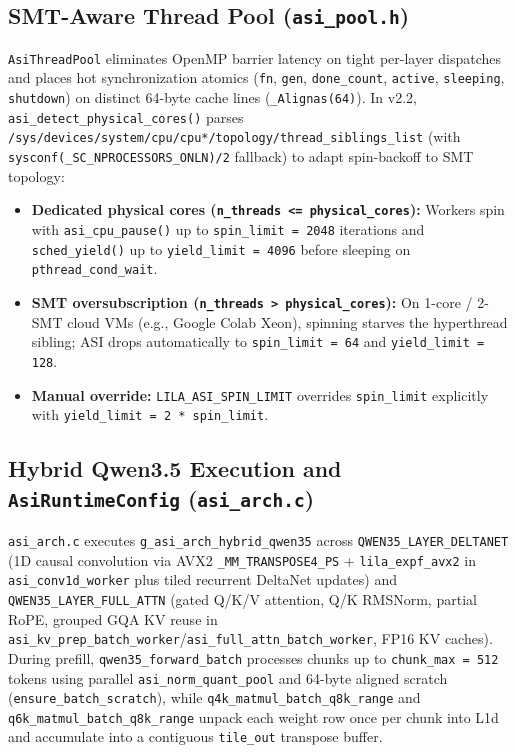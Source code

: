 \documentclass[11pt,a4paper]{article}
\begin{document}
\subsection{SMT-Aware Thread Pool (\texttt{asi\_pool.h})}
\texttt{AsiThreadPool} eliminates OpenMP barrier latency on tight per-layer dispatches and places hot synchronization atomics (\texttt{fn}, \texttt{gen}, \texttt{done\_count}, \texttt{active}, \texttt{sleeping}, \texttt{shutdown}) on distinct 64-byte cache lines (\texttt{\_Alignas(64)}). In v2.2, \texttt{asi\_detect\_physical\_cores()} parses \texttt{/sys/devices/system/cpu/cpu*/topology/thread\_siblings\_list} (with \texttt{sysconf(\_SC\_NPROCESSORS\_ONLN)/2} fallback) to adapt spin-backoff to SMT topology:
\begin{itemize}
    \item \textbf{Dedicated physical cores (\texttt{n\_threads <= physical\_cores}):} Workers spin with \texttt{asi\_cpu\_pause()} up to \texttt{spin\_limit = 2048} iterations and \texttt{sched\_yield()} up to \texttt{yield\_limit = 4096} before sleeping on \texttt{pthread\_cond\_wait}.
    \item \textbf{SMT oversubscription (\texttt{n\_threads > physical\_cores}):} On 1-core / 2-SMT cloud VMs (e.g., Google Colab Xeon), spinning starves the hyperthread sibling; ASI drops automatically to \texttt{spin\_limit = 64} and \texttt{yield\_limit = 128}.
    \item \textbf{Manual override:} \texttt{LILA\_ASI\_SPIN\_LIMIT} overrides \texttt{spin\_limit} explicitly with \texttt{yield\_limit = 2 * spin\_limit}.
\end{itemize}

\subsection{Hybrid Qwen3.5 Execution and \texttt{AsiRuntimeConfig} (\texttt{asi\_arch.c})}
\texttt{asi\_arch.c} executes \texttt{g\_asi\_arch\_hybrid\_qwen35} across \texttt{QWEN35\_LAYER\_DELTANET} (1D causal convolution via AVX2 \texttt{\_MM\_TRANSPOSE4\_PS} + \texttt{lila\_expf\_avx2} in \texttt{asi\_conv1d\_worker} plus tiled recurrent DeltaNet updates) and \texttt{QWEN35\_LAYER\_FULL\_ATTN} (gated Q/K/V attention, Q/K RMSNorm, partial RoPE, grouped GQA KV reuse in \texttt{asi\_kv\_prep\_batch\_worker}/\texttt{asi\_full\_attn\_batch\_worker}, FP16 KV caches). During prefill, \texttt{qwen35\_forward\_batch} processes chunks up to \texttt{chunk\_max = 512} tokens using parallel \texttt{asi\_norm\_quant\_pool} and 64-byte aligned scratch (\texttt{ensure\_batch\_scratch}), while \texttt{q4k\_matmul\_batch\_q8k\_range} and \texttt{q6k\_matmul\_batch\_q8k\_range} unpack each weight row once per chunk into L1d and accumulate into a contiguous \texttt{tile\_out} transpose buffer.
\end{document}
